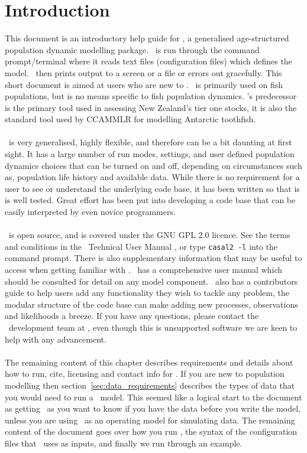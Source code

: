 \section{Introduction}\label{sec:introduction}

This document is an introductory help guide for \CNAME, a generalised age-structured population dynamic modelling package. \CNAME\ is run through the command prompt/terminal where it reads text files (configuration files) which defines the model. \CNAME\ then prints output to a screen or a file or errors out gracefully. This short document is aimed at users who are new to \CNAME. \CNAME\ is primarily used on fish populations, but is no means specific to fish population dynamics. \CNAME's predecessor is the primary tool used in assessing New Zealand's tier one stocks, it is also the standard tool used by CCAMMLR for modelling Antarctic toothfish. 
\\\\
\CNAME\ is very generalised, highly flexible, and therefore can be a bit daunting at first sight. It has a large number of run modes, settings, and user defined population dynamics choices that can be turned on and off, depending on circumstances such as, population life history and available data. While there is no requirement for a user to see or understand the underlying code base, it has been written so that is is well tested. Great effort has been put into developing a code base that can be easily interpreted by even novice programmers.
\\\\
\CNAME\ is open source, and is covered under the GNU GPL 2.0 licence. See the terms and conditions in the \CNAME\ Technical User Manual \citep{CASAL2}, or type \texttt{casal2 -l} into the command prompt. There is also supplementary information that may be useful to access when getting familiar with \CNAME. \CNAME\ has a comprehensive user manual \citep{CASAL2} which should be consulted for detail on any model component. \CNAME\ also has a contributors guide to help users add any functionality they wish to tackle any problem, the modular structure of the code base can make adding new processes, observations and likelihoods a breeze. If you have any questions, please contact the \CNAME\ development team at \email, even though this is unsupported software we are keen to help with any advancement.
\\\\
The remaining content of this chapter describes requirements and details about how to run, cite, licensing and contact info for \CNAME. If you are new to population modelling then section~\ref{sec:data_requirements} describes the types of data that you would need to run a \CNAME\ model. This seemed like a logical start to the document as getting \CNAME\ as you want to know if you have the data before you write the model, unless you are using \CNAME\ as an operating model for simulating data. 
The remaining content of the document goes over how you run \CNAME, the syntax of the configuration files that \CNAME\ uses as inputs, and finally we run through an example.
\\\\
